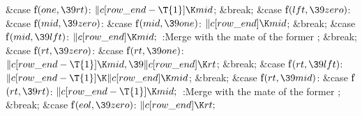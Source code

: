 \&{case} \|f${}(\\{one},\39\\{rt}){}$:\5
${}\|c[\\{row\_end}-\T{1}]\K\\{mid}{}$;\5
\&{break};\6
\4\&{case} \|f${}(\\{lft},\39\\{zero}){}$:\5
\&{case} \|f${}(\\{mid},\39\\{zero}){}$:\5
\&{case} \|f${}(\\{mid},\39\\{one}){}$:\5
${}\|c[\\{row\_end}]\K\\{mid}{}$;\5
\&{break};\6
\4\&{case} \|f${}(\\{mid},\39\\{lft}){}$:\5
${}\|c[\\{row\_end}]\K\\{mid};{}$\6
:Merge with the mate of the former \X;\5
\&{break};\6
\4\&{case} \|f${}(\\{rt},\39\\{zero}){}$:\5
\&{case} \|f${}(\\{rt},\39\\{one}){}$:\5
${}\|c[\\{row\_end}-\T{1}]\K\\{mid},\39\|c[\\{row\_end}]\K\\{rt}{}$;\5
\&{break};\6
\4\&{case} \|f${}(\\{rt},\39\\{lft}){}$:\5
${}\|c[\\{row\_end}-\T{1}]\K\|c[\\{row\_end}]\K\\{mid}{}$;\5
\&{break};\6
\4\&{case} \|f${}(\\{rt},\39\\{mid}){}$:\5
\&{case} \|f${}(\\{rt},\39\\{rt}){}$:\5
${}\|c[\\{row\_end}-\T{1}]\K\\{mid};{}$\6
:Merge with the mate of the former \X;\5
\&{break};\6
\4\&{case} \|f${}(\\{eol},\39\\{zero}){}$:\5
${}\|c[\\{row\_end}]\K\\{rt};{}$\6
